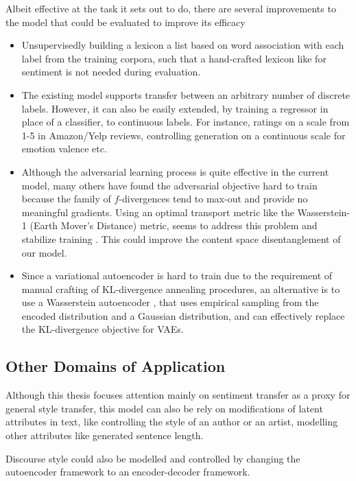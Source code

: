 Albeit effective at the task it sets out to do, there are several improvements to the model that could be evaluated to improve its efficacy
\begin{itemize}
	\item Unsupervisedly building a lexicon a list based on word association with each label from the training corpora, such that a hand-crafted lexicon like \cite{hu2004mining} for sentiment is not needed during evaluation.
	\item The existing model supports transfer between an arbitrary number of discrete labels. However, it can also be easily extended, by training a regressor in place of a classifier, to continuous labels. For instance, ratings on a scale from 1-5 in Amazon/Yelp reviews, controlling generation on a continuous scale for emotion valence etc.
	\item Although the adversarial learning process is quite effective in the current model, many others have found the adversarial objective hard to train because the family of $f$-divergences tend to max-out and provide no meaningful gradients. Using an optimal transport metric like the Wasserstein-1 (Earth Mover's Distance) metric, seems to address this problem and stabilize training \citep{arjovsky2017wasserstein, gulrajani2017improved}. This could improve the content space disentanglement of our model.
	\item Since a variational autoencoder is hard to train due to the requirement of manual crafting of KL-divergence annealing procedures, an alternative is to use a Wasserstein autoencoder \citep{tolstikhin2017wasserstein}, that uses empirical sampling from the encoded distribution and a Gaussian distribution, and can effectively replace the KL-divergence objective for VAEs.
\end{itemize}


\subsection{Other Domains of Application}

Although this thesis focuses attention mainly on sentiment transfer as a proxy for general style transfer, this model can also be  rely on modifications of latent attributes in text, like controlling the style of an author or an artist, modelling other attributes like generated sentence length.

Discourse style could also be modelled and controlled by changing the autoencoder framework to an encoder-decoder framework.
